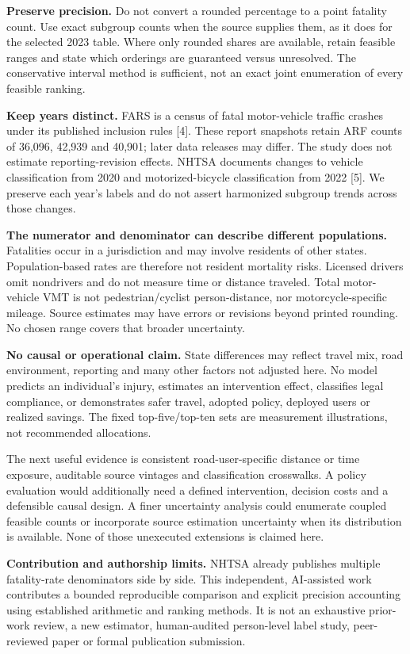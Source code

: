 \documentclass[10pt,letterpaper]{article}
\begin{document}
\textbf{Preserve precision.} Do not convert a rounded percentage to a point fatality count. Use exact subgroup counts when the source supplies them, as it does for the selected 2023 table. Where only rounded shares are available, retain feasible ranges and state which orderings are guaranteed versus unresolved. The conservative interval method is sufficient, not an exact joint enumeration of every feasible ranking.

\textbf{Keep years distinct.} FARS is a census of fatal motor-vehicle traffic crashes under its published inclusion rules [4]. These report snapshots retain ARF counts of 36,096, 42,939 and 40,901; later data releases may differ. The study does not estimate reporting-revision effects. NHTSA documents changes to vehicle classification from 2020 and motorized-bicycle classification from 2022 [5]. We preserve each year's labels and do not assert harmonized subgroup trends across those changes.

\textbf{The numerator and denominator can describe different populations.} Fatalities occur in a jurisdiction and may involve residents of other states. Population-based rates are therefore not resident mortality risks. Licensed drivers omit nondrivers and do not measure time or distance traveled. Total motor-vehicle VMT is not pedestrian/cyclist person-distance, nor motorcycle-specific mileage. Source estimates may have errors or revisions beyond printed rounding. No chosen range covers that broader uncertainty.

\textbf{No causal or operational claim.} State differences may reflect travel mix, road environment, reporting and many other factors not adjusted here. No model predicts an individual's injury, estimates an intervention effect, classifies legal compliance, or demonstrates safer travel, adopted policy, deployed users or realized savings. The fixed top-five/top-ten sets are measurement illustrations, not recommended allocations.

The next useful evidence is consistent road-user-specific distance or time exposure, auditable source vintages and classification crosswalks. A policy evaluation would additionally need a defined intervention, decision costs and a defensible causal design. A finer uncertainty analysis could enumerate coupled feasible counts or incorporate source estimation uncertainty when its distribution is available. None of those unexecuted extensions is claimed here.

\textbf{Contribution and authorship limits.} NHTSA already publishes multiple fatality-rate denominators side by side. This independent, AI-assisted work contributes a bounded reproducible comparison and explicit precision accounting using established arithmetic and ranking methods. It is not an exhaustive prior-work review, a new estimator, human-audited person-level label study, peer-reviewed paper or formal publication submission.
\end{document}
